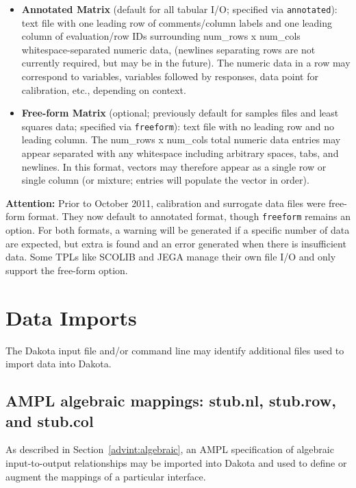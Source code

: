 \begin{itemize}
\item {\bf Annotated Matrix} (default for all tabular I/O; specified
  via {\tt annotated}): text file with one leading row of
  comments/column labels and one leading column of evaluation/row IDs
  surrounding num\_rows x num\_cols whitespace-separated numeric data,
  (newlines separating rows are not currently required, but may be in
  the future).  The numeric data in a row may correspond to variables,
  variables followed by responses, data point for calibration, etc.,
  depending on context.

\item {\bf Free-form Matrix} (optional; previously default for samples
  files and least squares data; specified via {\tt freeform}): text
  file with no leading row and no leading column.  The num\_rows x
  num\_cols total numeric data entries may appear separated with any
  whitespace including arbitrary spaces, tabs, and newlines.  In this
  format, vectors may therefore appear as a single row or single
  column (or mixture; entries will populate the vector in order).
\end{itemize}

{\bf Attention:} Prior to October 2011, calibration and surrogate data
files were free-form format.  They now default to annotated format,
though {\tt freeform} remains an option.  For both formats, a warning
will be generated if a specific number of data are expected, but extra
is found and an error generated when there is insufficient data.  Some
TPLs like SCOLIB and JEGA manage their own file I/O and only support
the free-form option.

\section{Data Imports}\label{input:import}

The Dakota input file and/or command line may identify additional
files used to import data into Dakota.

\subsection{AMPL algebraic mappings: stub.nl, stub.row, and stub.col}

As described in Section~\ref{advint:algebraic}, an AMPL
specification of algebraic input-to-output relationships may be
imported into Dakota and used to define or augment the mappings of a
particular interface.

